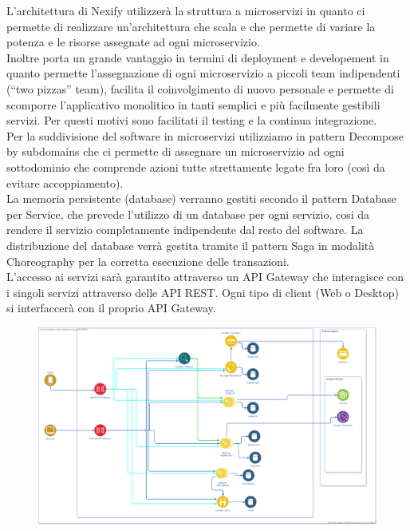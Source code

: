 L’architettura di Nexify utilizzerà la struttura a microservizi in quanto ci permette di realizzare un’architettura che scala e che permette di variare la potenza e le risorse assegnate ad ogni microservizio.\\
Inoltre porta un grande vantaggio in termini di deployment e developement in quanto permette l’assegnazione di ogni microservizio a piccoli team indipendenti (“two pizzas” team), facilita il coinvolgimento di nuovo personale e permette di scomporre l’applicativo monolitico in tanti semplici e più facilmente gestibili servizi. Per questi motivi sono facilitati il testing e la continua integrazione.\\
Per la suddivisione del software in microservizi utilizziamo in pattern Decompose by subdomains che ci permette di assegnare un microservizio ad ogni sottodominio che comprende azioni tutte strettamente legate fra loro (così da evitare accoppiamento).\\
La memoria persistente (database) verranno gestiti secondo il pattern Database per Service, che prevede l’utilizzo di un database per ogni servizio, cosi da rendere il servizio completamente indipendente dal resto del software. La distribuzione del database verrà gestita tramite il pattern Saga in modalità Choreography per la corretta esecuzione delle transazioni.\\
L’accesso ai servizi sarà garantito attraverso un API Gateway che interagisce con i singoli servizi attraverso delle API REST. Ogni tipo di client (Web o Desktop) si interfaccerà con il proprio API Gateway.\\
\begin{figure}[!h]
\centering
\includegraphics[scale=0.24]{../Contents/Diagrams/Design/architecture/Architecture.png}
\end{figure}
